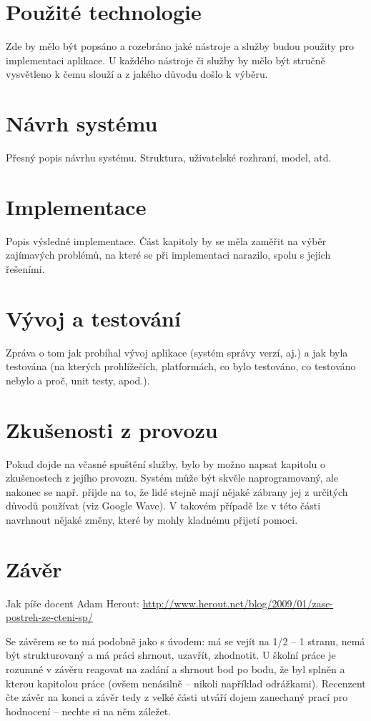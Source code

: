 \documentclass[12pt,oneside,final]{fithesis2}
\begin{document}
\chapter{Použité technologie}
Zde by mělo být popsáno a rozebráno jaké nástroje a služby budou použity pro implementaci aplikace. U každého nástroje či služby by mělo být stručně vysvětleno k čemu slouží a z jakého důvodu došlo k výběru.

\chapter{Návrh systému}
Přesný popis návrhu systému. Struktura, uživatelské rozhraní, model, atd.

\chapter{Implementace}
Popis výsledné implementace. Část kapitoly by se měla zaměřit na výběr zajímavých problémů, na které se při implementaci narazilo, spolu s jejich řešeními.

\chapter{Vývoj a testování}
Zpráva o tom jak probíhal vývoj aplikace (systém správy verzí, aj.) a jak byla testována (na kterých prohlížečích, platformách, co bylo testováno, co testováno nebylo a proč, unit testy, apod.).

\chapter{Zkušenosti z provozu}
Pokud dojde na včasné spuštění služby, bylo by možno napsat kapitolu o zkušenostech z jejího provozu. Systém může být skvěle naprogramovaný, ale nakonec se např. přijde na to, že lidé stejně mají nějaké zábrany jej z určitých důvodů používat (viz Google Wave). V takovém případě lze v této části navrhnout nějaké změny, které by mohly kladnému přijetí pomoci.

\chapter{Závěr}
Jak píše docent Adam Herout: \url{http://www.herout.net/blog/2009/01/zase-postreh-ze-cteni-sp/}

Se závěrem se to má podobně jako s úvodem: má se vejít na 1/2 – 1 stranu, nemá být strukturovaný a má práci shrnout, uzavřít, zhodnotit. U školní práce je rozumné v závěru reagovat na zadání a shrnout bod po bodu, že byl splněn a kterou kapitolou práce (ovšem nenásilně – nikoli například odrážkami). Recenzent čte závěr na konci a závěr tedy z velké části utváří dojem zanechaný prací pro hodnocení – nechte si na něm záležet.


% 
% 
\end{document}
